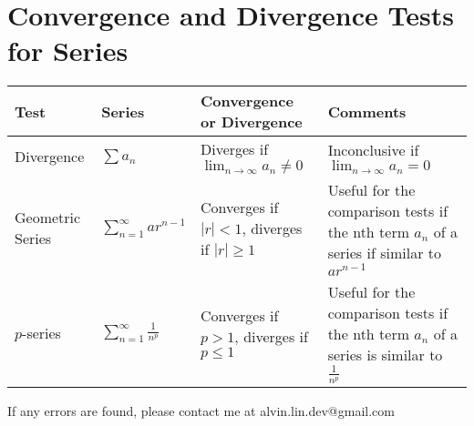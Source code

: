 \documentclass[letterpaper, 12pt]{math}
\begin{document}
\section*{Convergence and Divergence Tests for Series}
\bgroup
  \def\arraystretch{2}
  \begin{tabular}{| m{2cm} | m{2cm} | m{5cm} | m{6cm} |}
    \hline
    Test & Series & Convergence or Divergence & Comments \\
    \hline
      Divergence &
      \( \sum{a_{n}} \) &
      Diverges if \( \lim_{n\to\infty}{a_{n}} \neq 0 \) &
      Inconclusive if \( \lim_{n\to\infty}{a_{n}} = 0 \) \\
    \hline
      Geometric Series &
      \( \sum_{n=1}^{\infty}{ar^{n-1}} \) &
      Converges if \( |r| < 1 \), diverges if \( |r| \geq 1 \) &
      Useful for the comparison tests if the nth term \( a_{n} \) of a series
        if similar to \( ar^{n-1} \) \\
    \hline
      \( p \)-series &
      \( \sum_{n=1}^{\infty}\frac{1}{n^{p}} \) &
      Converges if \( p > 1 \), diverges if \( p \leq 1 \) &
      Useful for the comparison tests if the nth term \( a_{n} \) of a series
      is similar to \( \frac{1}{n^{p}} \) \\
    \hline
  \end{tabular}
\egroup

\begin{center}
  If any errors are found, please contact me at alvin.lin.dev@gmail.com
\end{center}
\end{document}
